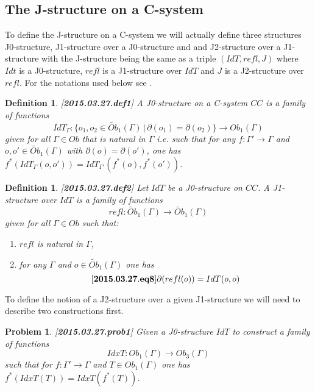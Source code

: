 \documentclass[12pt]{article}
\newenvironment{eq}{\begin{equation}}{\end{equation}}
\newtheorem{definition}[proposition]{Definition}
\newtheorem{problem}[proposition]{Problem}
\newcommand{\llabel}[1]{\label{#1}[{\bf #1}]}
\newcommand{\sr}{\rightarrow}
\newcommand{\wt}{\widetilde}
\begin{document}
\subsection{The J-structure on a C-system}
%


To define the J-structure on a C-system we will actually define three structures J0-structure, J1-structure over a J0-structure and and J2-structure over a J1-structure with the J-structure being the same as a triple $(IdT,refl,J)$ where $Idt$ is a J0-structure, $refl$ is a J1-structure over $IdT$ and $J$ is a J2-structure over $refl$. For the notations used below see \cite{fromunivwithPi}.
%
\begin{definition}
\llabel{2015.03.27.def1}
A J0-structure on a C-system $CC$ is a family of functions 
%
$$IdT_{\Gamma}:\{o_1,o_2\in \wt{Ob}_1(\Gamma)\,|\,\partial(o_1)=\partial(o_2)\}\sr Ob_1(\Gamma)$$
%
given for all $\Gamma\in Ob$ that is natural in $\Gamma$ i.e. such that for any $f:\Gamma'\sr \Gamma$ and $o,o'\in \wt{Ob}_1(\Gamma)$ with $\partial(o)=\partial(o')$, one has $f^*(IdT_{\Gamma}(o,o'))=IdT_{\Gamma'}(f^*(o),f^*(o'))$.
\end{definition}
%
\begin{definition}
\llabel{2015.03.27.def2}
Let $IdT$ be a J0-structure on $CC$. A J1-structure over $IdT$ is a family of functions
%
$$refl:\wt{Ob}_1(\Gamma)\sr \wt{Ob}_1(\Gamma)$$
%
given for all $\Gamma\in Ob$ such that:
%
\begin{enumerate}
\item $refl$ is natural in $\Gamma$,
\item for any $\Gamma$ and $o\in \wt{Ob}_1(\Gamma)$ one has 
%
\begin{eq}
\llabel{2015.03.27.eq8}
\partial(refl(o))=IdT(o,o)
\end{eq}
\end{enumerate}
\end{definition}
%
To define the notion of a J2-structure over a given J1-structure we will need to describe two constructions first.
%
\begin{problem}
\llabel{2015.03.27.prob1}
Given a J0-structure $IdT$ to construct a family of functions
%
$$IdxT:Ob_1(\Gamma)\sr Ob_3(\Gamma)$$
%
such that for $f:\Gamma'\sr \Gamma$ and $T\in Ob_1(\Gamma)$ one has $f^*(IdxT(T))=IdxT(f^*(T))$.
\end{problem}
%
\end{document}
